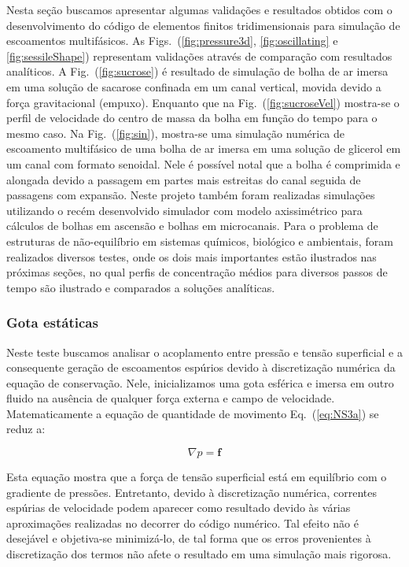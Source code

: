 \documentclass[a4paper,portuges,12pt]{article}
\newcommand{\fvet}{\mathbf{f}}
\begin{document}
Nesta seção buscamos apresentar algumas validações e resultados obtidos
com o desenvolvimento do código de elementos finitos tridimensionais
para simulação de escoamentos multifásicos. As
Figs.~(\ref{fig:pressure3d}, \ref{fig:oscillating} e
\ref{fig:sessileShape})
representam validações através de comparação com resultados analíticos.
A Fig.~(\ref{fig:sucrose}) é resultado de simulação de bolha de ar
imersa em uma solução de sacarose confinada em um canal vertical, movida
devido a força gravitacional (empuxo). Enquanto que na
Fig.~(\ref{fig:sucroseVel}) mostra-se o perfil de velocidade do centro
de massa da bolha em função do tempo para o mesmo caso. Na
Fig.~(\ref{fig:sin}), mostra-se uma simulação numérica de escoamento
multifásico de uma bolha de ar imersa em uma solução de glicerol em um
canal com formato senoidal. Nele é possível notal que a bolha é
comprimida e alongada devido a passagem em partes mais estreitas do
canal seguida de passagens com expansão. Neste projeto também foram
realizadas simulações utilizando o recém desenvolvido simulador
com modelo axissimétrico para cálculos de bolhas em ascensão e bolhas em
microcanais. Para o problema de estruturas de
não-equilíbrio em sistemas químicos, biológico e ambientais, foram
realizados diversos testes, onde os dois mais importantes estão
ilustrados nas próximas seções, no qual perfis de concentração médios
para diversos passos de tempo são ilustrado e comparados a soluções
analíticas. 

\subsubsection{Gota estáticas}

Neste teste buscamos analisar o acoplamento entre pressão e tensão
superficial e a consequente geração de escoamentos espúrios devido à
discretização numérica da equação de conservação. Nele, inicializamos
uma gota esférica e imersa em outro fluido na ausência de qualquer força
externa e campo de velocidade. Matematicamente a equação de quantidade
de movimento Eq.~(\ref{eq:NS3a}) se reduz a:

\begin{equation}
	\nabla p = \fvet
\end{equation}

Esta equação mostra que a força de tensão superficial está em equilíbrio
com o gradiente de pressões. Entretanto, devido à discretização
numérica, correntes espúrias de velocidade podem aparecer como resultado
devido às várias aproximações realizadas no decorrer do código numérico.
Tal efeito não é desejável e objetiva-se minimizá-lo, de tal forma que
os erros provenientes à discretização dos termos não afete o resultado
em uma simulação mais rigorosa. 
\end{document}
